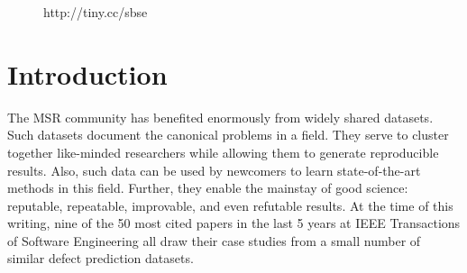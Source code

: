 \documentclass[table, xcdraw, sigconf,review, anonymous]{acmart}
\begin{document}


\keywords{}


\maketitle
\pagestyle{plain}
% 



\begin{figure}[!b]
 
{\center
{}}
\caption{http://tiny.cc/sbse}\label{fig:one}
\end{figure}

\section{Introduction}


The MSR  community has benefited enormously from widely shared datasets.  Such datasets document the canonical problems in a field.
They serve to cluster together like-minded researchers while  
  allowing   them to generate reproducible results. Also, such data can be used by
   newcomers to learn state-of-the-art methods in this field. Further, they enable the mainstay of good science:
reputable, repeatable,  improvable, and even refutable results.
At the time of this writing,   nine of the 50 most cited papers in the last 5 years at IEEE Transactions of Software Engineering all draw their case studies
from a small number of similar defect prediction datasets.
\end{document}
